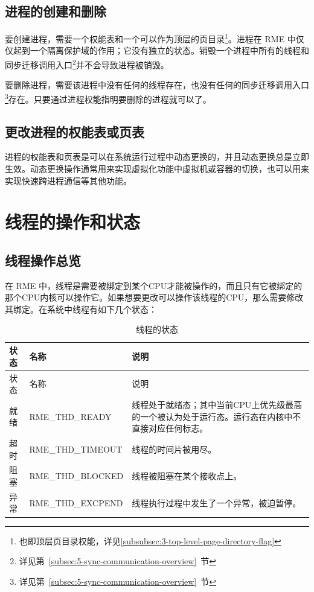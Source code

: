 \subsection{进程的创建和删除}\label{subsec:4-process-creation-and-deletion}

要创建进程，需要一个权能表和一个可以作为顶层的页目录\footnote{也即顶层页目录权能，详见\ref{subsubsec:3-top-level-page-directory-flag}}。进程在 RME 中仅仅起到一个隔离保护域的作用；它没有独立的状态。销毁一个进程中所有的线程和同步迁移调用入口\footnote{详见第~\ref{subsec:5-sync-communication-overview}~节}并不会导致进程被销毁。

要删除进程，需要该进程中没有任何的线程存在，也没有任何的同步迁移调用入口\footnote{详见第~\ref{subsec:5-sync-communication-overview}~节}存在。只要通过进程权能指明要删除的进程就可以了。

\subsection{更改进程的权能表或页表}\label{subsec:4-change-process-capability-table-or-page-table}

进程的权能表和页表是可以在系统运行过程中动态更换的，并且动态更换总是立即生效。动态更换操作通常用来实现虚拟化功能中虚拟机或容器的切换，也可以用来实现快速跨进程通信等其他功能。

\section{线程的操作和状态}\label{sec:4-thread-operations-and-states}

\subsection{线程操作总览}\label{subsec:4-thread-operations-overview}

在 RME 中，线程是需要被绑定到某个CPU才能被操作的，而且只有它被绑定的那个CPU内核可以操作它。如果想要更改可以操作该线程的CPU，那么需要修改其绑定。在系统中线程有如下几个状态：

\begin{xltabular}{\textwidth}{@{}>{\hsize\raggedright\arraybackslash}X>{\hsize\raggedright\arraybackslash}X>{\hsize\raggedright\arraybackslash}X@{}}
\caption{线程的状态}\label{tab:4-1-thread-states}\\
\toprule
状态 & 名称 & 说明\tabularnewline
\endfirsthead
\toprule
状态 & 名称 & 说明\tabularnewline
\midrule
\endhead
\bottomrule
\endlastfoot
就绪 & RME\_THD\_READY &
线程处于就绪态；其中当前CPU上优先级最高的一个被认为处于运行态。运行态在内核中不直接对应任何标志。\tabularnewline
超时 & RME\_THD\_TIMEOUT & 线程的时间片被用尽。\tabularnewline
阻塞 & RME\_THD\_BLOCKED & 线程被阻塞在某个接收点上。\tabularnewline
异常 & RME\_THD\_EXCPEND &
线程执行过程中发生了一个异常，被迫暂停。\tabularnewline
\end{xltabular}

